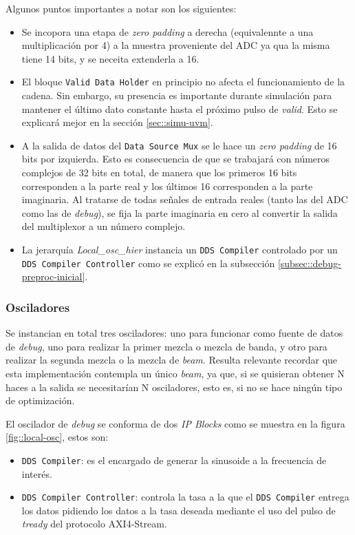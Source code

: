 \documentclass[../../main.tex]{subfiles}
\begin{document}
Algunos puntos importantes a notar son los siguientes:
\begin{itemize}
    \item Se incopora una etapa de \textit{zero padding} a derecha (equivalennte a una multiplicación por 4) a la muestra proveniente del ADC ya qua la misma tiene 14 bits, y se neceita extenderla a 16.
    \item El bloque \texttt{Valid Data Holder} en principio no afecta el funcionamiento de la cadena. Sin embargo, su presencia es importante durante simulación para mantener el último dato constante hasta el próximo pulso de \textit{valid}. Esto se explicará mejor en la sección \ref{sec::simu-uvm}.
    \item A la salida de datos del \texttt{Data Source Mux} se le hace un \textit{zero padding} de 16 bits por izquierda. Esto es consecuencia de que se trabajará con números complejos de 32 bits en total, de manera que los primeros 16 bits corresponden a la parte real y los últimos 16 corresponden a la parte imaginaria. Al tratarse de todas señales de entrada reales (tanto las del ADC como las de \textit{debug}), se fija la parte imaginaria en cero al convertir la salida del multiplexor a un número complejo.
    \item La jerarquía \textit{Local\_osc\_hier} instancia un \texttt{DDS Compiler} controlado por un \texttt{DDS Compiler Controller} como se explicó en la subsección \ref{subsec::debug-preproc-inicial}.
\end{itemize}


\subsubsection{Osciladores}
Se instancian en total tres osciladores: uno para funcionar como fuente de datos de \textit{debug}, uno para realizar la primer mezcla o mezcla de banda, y otro para realizar la segunda mezcla o la mezcla de \textit{beam}. Resulta relevante recordar que esta implementación contempla un único \textit{beam}, ya que, si se quisieran obtener N haces a la salida se necesitarían N osciladores, esto es, si no se hace ningún tipo de optimización.

El oscilador de \textit{debug} se conforma de dos \textit{IP Blocks} como se muestra en la figura \ref{fig::local-osc}, estos son:
\begin{itemize}
    \item \texttt{DDS Compiler}: es el encargado de generar la sinusoide a la frecuencia de interés.
    \item \texttt{DDS Compiler Controller}: controla la tasa a la que el \texttt{DDS Compiler} entrega los datos pidiendo los datos a la tasa deseada mediante el uso del pulso de \textit{tready} del protocolo AXI4-Stream.
\end{itemize}
\end{document}
